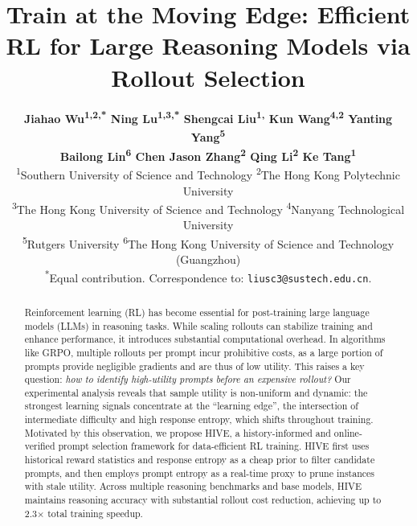 \documentclass{article}
\title{Train at the Moving Edge: Efficient RL for Large Reasoning Models via Rollout Selection}
\author{%
\begin{minipage}{0.98\textwidth}
\centering
\normalfont\small
{\bfseries
Jiahao Wu\textsuperscript{1,2,*} \quad
Ning Lu\textsuperscript{1,3,*} \quad
Shengcai Liu\textsuperscript{1,\textdagger} \quad
Kun Wang\textsuperscript{4,2} \quad
Yanting Yang\textsuperscript{5}
}\\[-0.05em]
{\bfseries
Bailong Lin\textsuperscript{6} \quad
Chen Jason Zhang\textsuperscript{2} \quad
Qing Li\textsuperscript{2} \quad
Ke Tang\textsuperscript{1}
}\\[0.4em]
{\scriptsize
\textsuperscript{1}Southern University of Science and Technology \quad
\textsuperscript{2}The Hong Kong Polytechnic University
}\\[-0.1em]
{\scriptsize
\textsuperscript{3}The Hong Kong University of Science and Technology \quad
\textsuperscript{4}Nanyang Technological University
}\\[-0.1em]
{\scriptsize
\textsuperscript{5}Rutgers University \quad
\textsuperscript{6}The Hong Kong University of Science and Technology (Guangzhou)
}\\[0.2em]
{\scriptsize
\textsuperscript{*}Equal contribution. \quad
\textsuperscript{\textdagger}Correspondence to: \texttt{liusc3@sustech.edu.cn}.
}
\end{minipage}
}
\theoremstyle{plain}
\theoremstyle{definition}
\theoremstyle{remark}
\newcommand{\red}[1]{\textcolor{red}{#1}}
\begin{document}
\maketitle
\suppressfloats[t]

\begin{abstract}
Reinforcement learning (RL) has become essential for post-training large language models (LLMs) in reasoning tasks. While scaling rollouts can stabilize training and enhance performance, it introduces substantial computational overhead. In algorithms like GRPO, multiple rollouts per prompt incur prohibitive costs, as a large portion of prompts provide negligible gradients and are thus of low utility. This raises a key question: \textit{how to identify high-utility prompts before an expensive rollout?} 
Our experimental analysis reveals that sample utility is non-uniform and dynamic: the strongest learning signals concentrate at the ``learning edge'', the intersection of intermediate difficulty and high response entropy, which shifts throughout training. Motivated by this observation, we propose HIVE, a history-informed and online-verified prompt selection framework for data-efficient RL training. HIVE first uses historical reward statistics and response entropy as a cheap prior to filter candidate prompts, and then employs prompt entropy as a real-time proxy to prune instances with stale utility. Across multiple reasoning benchmarks and base models, HIVE maintains  reasoning accuracy with substantial rollout cost reduction, achieving up to 2.3× total training speedup. 

\end{abstract}













\newpage

\end{document}
